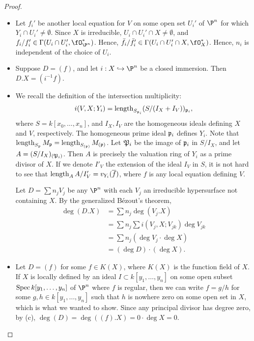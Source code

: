 \documentclass[a4paper]{article}
\begin{document}
\begin{enumerate} [label=\textbf{\arabic*.}, leftmargin=0em]
\begin{proof} $ $ \vspace{0pt}
\begin{itemize} [leftmargin=0cm]
\item[(a)] Let $f_i'$ be another local equation for $V$ on some open set $U_i'$ of $\P^n$ for which $Y_i \cap U_i' \neq \emptyset$. Since $X$ is irreducible, $U_i \cap U_i' \cap X \neq \emptyset$, and $f_i / f_i' \in \Gamma(U_i \cap U_i', \fO_{\P^n}^*)$. Hence, $\bar{f}_i / \bar{f}_i' \in \Gamma(U_i \cap U_i' \cap X, \fO_X^*)$. Hence, $n_i$ is independent of the choice of $U_i$.

\item[(b)] Suppose $D = (f)$, and let $i : X \hookrightarrow \P^n$ be a closed immersion. Then $D.X = (i^{-1}f)$.

\item[(c)] We recall the definition of the intersection multiplicity:  
\[
    i(V, X; Y_i) = \operatorname{length}_{S_{\mathfrak{p}_i}} (S/(I_X + I_V))_{\mathfrak{p}_i},
\]
where \( S = k[x_0, \dots, x_n] \), and \( I_X, I_V \) are the homogeneous ideals defining \( X \) and \( V \), respectively. The homogeneous prime ideal \( \mathfrak{p}_i \) defines \( Y_i \). Note that $\operatorname{length}_{S_{\mathfrak{p}}} M_{\mathfrak{p}} = \operatorname{length}_{S_{(\mathfrak{p})}} M_{(\mathfrak{p})}$. Let $\mathfrak{P}_i$ be the image of $\mathfrak{p}_i$ in $S / I_X$, and let $A = (S / I_X)_{(\mathfrak{P}_i)}$. Then $A$ is precisely the valuation ring of $Y_i$ as a prime divisor of $X$. If we denote $I'_V$ the extension of the ideal $I_V$ in $S$, it is not hard to see that $\operatorname{length}_A A / I_V' = v_{Y_i}(\overline{f})$, where $f$ is any local equation defining $V$.

Let $D = \sum n_j V_j$ be any $\P^n$ with each $V_j$ an irreducible hypersurface not containing $X$. By the generalized Bézout's theorem,
\begin{align*}
    \deg(D.X) & = \sum n_j \deg(V_j.X) \\
    & = \sum n_j \sum i(V_j, X ; V_{jk}) \deg{V_{jk}} \\
    & = \sum n_j (\deg{V_j} \cdot \deg{X}) \\
    & = (\deg{D}) \cdot (\deg{X}).
\end{align*}

\item[(d)] Let $D = (f)$ for some $f \in K(X)$, where $K(X)$ is the function field of $X$. If $X$ is locally defined by an ideal $I \subset k[y_1, \dots, y_n]$ on some open subset $\operatorname{Spec}{k[y_1, \dots, y_n]}$ of $\P^n$ where $f$ is regular, then we can write $f = g / h$ for some $g, h \in k[y_1, \dots, y_n]$ such that $h$ is nowhere zero on some open set in $X$, which is what we wanted to show. Since any principal divisor has degree zero, by (c), $\deg(D) = \deg((f).X) = 0 \cdot \deg{X} = 0$.
\end{itemize}
\end{proof}


\end{enumerate}
\end{document}
